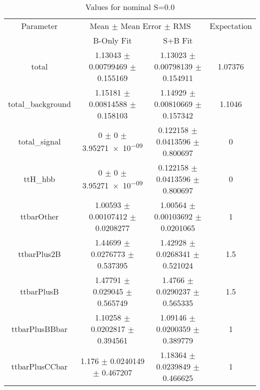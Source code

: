 \begin{table}
\centering
\caption{Values for nominal S=0.0}
\begin{tabular}{cccc}
\toprule
Parameter & \multicolumn{2}{c}{Mean $\pm$ Mean Error $\pm$ RMS} & Expectation\\
 & B-Only Fit & S+B Fit & \\
\midrule
total & \num{1.13043} $\pm$ \num{0.00799469} $\pm$ \num{0.155169} & \num{1.13023} $\pm$ \num{0.00798139} $\pm$ \num{0.154911} & \num{1.07376}\\
total\_background & \num{1.15181} $\pm$ \num{0.00814588} $\pm$ \num{0.158103} & \num{1.14929} $\pm$ \num{0.00810669} $\pm$ \num{0.157342} & \num{1.1046}\\
total\_signal & \num{0} $\pm$ \num{0} $\pm$ \num{3.95271e-09} & \num{0.122158} $\pm$ \num{0.0413596} $\pm$ \num{0.800697} & \num{0}\\
ttH\_hbb & \num{0} $\pm$ \num{0} $\pm$ \num{3.95271e-09} & \num{0.122158} $\pm$ \num{0.0413596} $\pm$ \num{0.800697} & \num{0}\\
ttbarOther & \num{1.00593} $\pm$ \num{0.00107412} $\pm$ \num{0.0208277} & \num{1.00564} $\pm$ \num{0.00103692} $\pm$ \num{0.0201065} & \num{1}\\
ttbarPlus2B & \num{1.44699} $\pm$ \num{0.0276773} $\pm$ \num{0.537395} & \num{1.42928} $\pm$ \num{0.0268341} $\pm$ \num{0.521024} & \num{1.5}\\
ttbarPlusB & \num{1.47791} $\pm$ \num{0.029045} $\pm$ \num{0.565749} & \num{1.4766} $\pm$ \num{0.0290237} $\pm$ \num{0.565335} & \num{1.5}\\
ttbarPlusBBbar & \num{1.10258} $\pm$ \num{0.0202817} $\pm$ \num{0.394561} & \num{1.09146} $\pm$ \num{0.0200359} $\pm$ \num{0.389779} & \num{1}\\
ttbarPlusCCbar & \num{1.176} $\pm$ \num{0.0240149} $\pm$ \num{0.467207} & \num{1.18364} $\pm$ \num{0.0239849} $\pm$ \num{0.466625} & \num{1}\\
\bottomrule
\end{tabular}
\end{table}